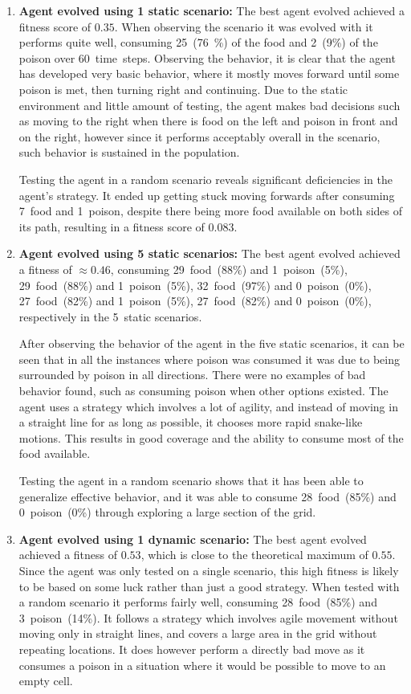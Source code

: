 \documentclass[paper=a4, fontsize=11pt]{scrartcl}
\begin{document}
\begin{enumerate}
\item \textbf{Agent evolved using 1 static scenario:} The best agent evolved achieved a fitness score of $0.35$. When observing the scenario it was evolved with it performs quite well, consuming 25~(76~\%) of the food and 2~(9\%) of the poison over 60~time~steps. Observing the behavior, it is clear that the agent has developed very basic behavior, where it mostly moves forward until some poison is met, then turning right and continuing. Due to the static environment and little amount of testing, the agent makes bad decisions such as moving to the right when there is food on the left and poison in front and on the right, however since it performs acceptably overall in the scenario, such behavior is sustained in the population.

Testing the agent in a random scenario reveals significant deficiencies in the agent's strategy. It ended up getting stuck moving forwards after consuming 7~food and 1~poison, despite there being more food available on both sides of its path, resulting in a fitness score of $0.083$.

\item \textbf{Agent evolved using 5 static scenarios:} The best agent evolved achieved a fitness of $\approx{}0.46$, consuming 29~food~(88\%) and 1~poison~(5\%), 29~food~(88\%) and 1~poison~(5\%), 32~food~(97\%) and 0~poison~(0\%), 27~food~(82\%) and 1~poison~(5\%), 27~food~(82\%) and 0~poison~(0\%), respectively in the 5~static scenarios.

After observing the behavior of the agent in the five static scenarios, it can be seen that in all the instances where poison was consumed it was due to being surrounded by poison in all directions. There were no examples of bad behavior found, such as consuming poison when other options existed. The agent uses a strategy which involves a lot of agility, and instead of moving in a straight line for as long as possible, it chooses more rapid snake-like motions. This results in good coverage and the ability to consume most of the food available.

Testing the agent in a random scenario shows that it has been able to generalize effective behavior, and it was able to consume 28~food~(85\%) and 0~poison~(0\%) through exploring a large section of the grid.

\item \textbf{Agent evolved using 1 dynamic scenario:} The best agent evolved achieved a fitness of $0.53$, which is close to the theoretical maximum of $0.55$. Since the agent was only tested on a single scenario, this high fitness is likely to be based on some luck rather than just a good strategy. When tested with a random scenario it performs fairly well, consuming 28~food~(85\%) and 3~poison~(14\%). It follows a strategy which involves agile movement without moving only in straight lines, and covers a large area in the grid without repeating locations. It does however perform a directly bad move as it consumes a poison in a situation where it would be possible to move to an empty cell.


\end{enumerate}
\end{document}
